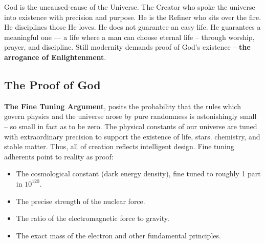 \documentclass[12pt,a4paper]{book}
\begin{document}
God is the uncaused-cause of the Universe.  The Creator who spoke the universe into existence with precision and purpose.  He is the Refiner who sits over the fire.  He disciplines those He loves.  He does not guarantee an easy life.  He guarantees a meaningful one — a life where a man can choose eternal life -- through worship, prayer, and discipline.   Still modernity demands proof of God's existence -- \textbf{the arrogance of Enlightenment}. 

\subsection{The Proof of God}
\textbf{The Fine Tuning Argument}, posits the probability that the rules which govern physics and the universe arose by pure randomness is astonishingly small -- so small in fact as to be zero.  The physical constants of our universe are tuned with extraordinary precision to support the existence of life, stars. chemistry, and stable matter.  Thus, all of creation reflects intelligent design.  Fine tuning adherents point to reality as proof:

\begin{itemize}
\item The cosmological constant (dark energy density), fine tuned to roughly 1 part in $10^{120}$.
\item The precise strength of the nuclear force.
\item The ratio of the electromagnetic force to gravity.
\item The exact mass of the electron and other fundamental principles.
\end{itemize}
\end{document}
